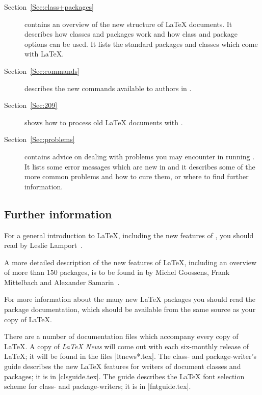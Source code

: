 \documentclass{ltxguide}[1994/11/20]
\begin{document}
\begin{description}
 
\item[Section~\ref{Sec:class+packages}]
   contains an overview of the new structure of
   \LaTeX{} documents.  It describes how classes and packages work and
   how class and package options can be used.  It lists the standard
   packages and classes which come with \LaTeX.
 
\item[Section~\ref{Sec:commands}] describes the new commands available
   to authors in \LaTeXe.
 
\item[Section~\ref{Sec:209}] shows how to process old \LaTeX{}
   documents with \LaTeXe.
 
\item[Section~\ref{Sec:problems}] contains advice on dealing with
   problems you may encounter in running \LaTeXe.
   It lists some error messages which are new in \LaTeXe{} and
   it describes some of the more common problems and how to cure them,
   or where to find further information.
 
\end{description}
 
\subsection{Further information}
 
For a general introduction to \LaTeX, including the new features of
\LaTeXe, you should read \emph{\LaTeXbook}
by Leslie Lamport~\cite{A-W:LLa94}.
 
A more detailed description of the new features of \LaTeX, including
an overview of more than 150 packages, is to be found in
\emph{\LaTeXcomp} by Michel Goossens, Frank Mittelbach and Alexander
Samarin~\cite{A-W:GMS94}.
 
For more information about the many new \LaTeX{} packages you should
read the package documentation, which should be available from the
same source as your copy of \LaTeX.
 
There are a number of documentation files which accompany every copy
of \LaTeX.  A copy of \emph{\LaTeX{} News} will come out with each
six-monthly release of \LaTeX; it will be found in the files
|ltnews*.tex|.  The class- and package-writer's guide \emph{\clsguide}
describes the new \LaTeX{} features for writers of document classes
and packages; it is in |clsguide.tex|.  The guide \emph{\fntguide}
describes the \LaTeX{} font selection scheme for class- and
package-writers; it is in |fntguide.tex|.
 
\end{document}
